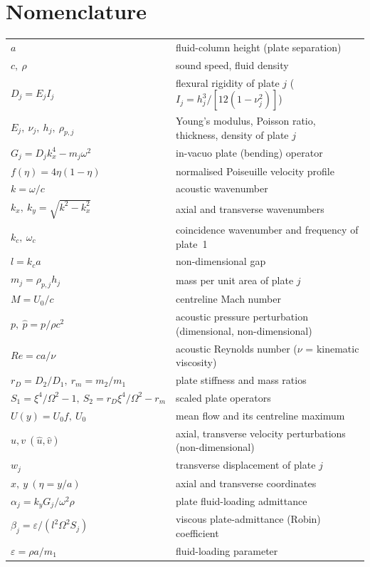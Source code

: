 \documentclass[11pt]{article}
\begin{document}
\section*{Nomenclature}
\noindent\begin{tabular}{@{}ll@{}}
$a$ & fluid-column height (plate separation)\\
$c,\ \rho$ & sound speed, fluid density\\
$D_j=E_jI_j$ & flexural rigidity of plate $j$ ($I_j=h_j^3/[12(1-\nu_j^2)]$)\\
$E_j,\ \nu_j,\ h_j,\ \rho_{p,j}$ & Young's modulus, Poisson ratio, thickness, density of plate $j$\\
$G_j=D_jk_x^4-m_j\omega^2$ & in-vacuo plate (bending) operator\\
$f(\eta)=4\eta(1-\eta)$ & normalised Poiseuille velocity profile\\
$k=\omega/c$ & acoustic wavenumber\\
$k_x,\ k_y=\sqrt{k^2-k_x^2}$ & axial and transverse wavenumbers\\
$k_c,\ \omega_c$ & coincidence wavenumber and frequency of plate~1\\
$l=k_ca$ & non-dimensional gap\\
$m_j=\rho_{p,j}h_j$ & mass per unit area of plate $j$\\
$M=U_0/c$ & centreline Mach number\\
$p,\ \hat p=p/\rho c^2$ & acoustic pressure perturbation (dimensional, non-dimensional)\\
$Re=ca/\nu$ & acoustic Reynolds number ($\nu$ = kinematic viscosity)\\
$r_D=D_2/D_1,\ r_m=m_2/m_1$ & plate stiffness and mass ratios\\
$S_1=\xi^4/\Omega^2-1,\ S_2=r_D\xi^4/\Omega^2-r_m$ & scaled plate operators\\
$U(y)=U_0f,\ U_0$ & mean flow and its centreline maximum\\
$u,v\ (\hat u,\hat v)$ & axial, transverse velocity perturbations (non-dimensional)\\
$w_j$ & transverse displacement of plate $j$\\
$x,\ y\ (\eta=y/a)$ & axial and transverse coordinates\\
$\alpha_j=k_yG_j/\omega^2\rho$ & plate fluid-loading admittance\\
$\beta_j=\varepsilon/(l^2\Omega^2S_j)$ & viscous plate-admittance (Robin) coefficient\\
$\varepsilon=\rho a/m_1$ & fluid-loading parameter\\

\end{tabular}
\end{document}
